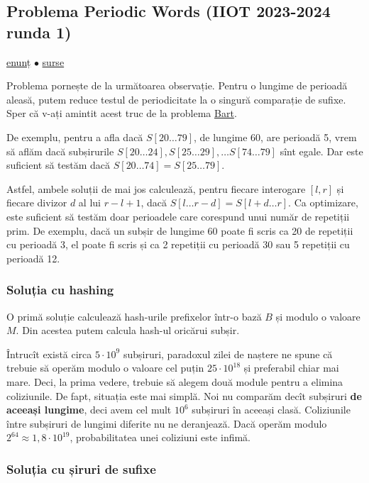 \documentclass[../main.tex]{subfiles}
\begin{document}
\subsection{Problema Periodic Words (IIOT 2023-2024 runda 1)}
\label{problem:periodic-words}

\href{https://kilonova.ro/problems/1940}{enunț}
$\bullet$
\hyperref[code:periodic-words]{surse}

Problema pornește de la următoarea observație. Pentru o lungime de perioadă aleasă, putem reduce testul de periodicitate la o singură comparație de sufixe. Sper că v-ați amintit acest truc de la problema \hyperref[problem:bart]{Bart}.

De exemplu, pentru a afla dacă $S[20 \dots 79]$, de lungime 60, are perioadă 5, vrem să aflăm dacă subșirurile $S[20 \dots 24], S[25 \dots 29], \dots S[74 \dots 79]$ sînt egale. Dar este suficient să testăm dacă $S[20 \dots 74] = S[25 \dots 79]$.

Astfel, ambele soluții de mai jos calculează, pentru fiecare interogare $[l, r]$ și fiecare divizor $d$ al lui $r - l + 1$, dacă $S[l \dots r - d] = S[l + d \dots r]$. Ca optimizare, este suficient să testăm doar perioadele care corespund unui număr de repetiții prim. De exemplu, dacă un subșir de lungime 60 poate fi scris ca 20 de repetiții cu perioadă 3, el poate fi scris și ca 2 repetiții cu perioadă 30 sau 5 repetiții cu perioadă 12.

\subsubsection*{Soluția cu hashing}

O primă soluție calculează hash-urile prefixelor într-o bază $B$ și modulo o valoare $M$. Din acestea putem calcula hash-ul oricărui subșir.

Întrucît există circa $5 \cdot 10^9$ subșiruri, paradoxul zilei de naștere ne spune că trebuie să operăm modulo o valoare cel puțin $25 \cdot 10^{18}$ și preferabil chiar mai mare. Deci, la prima vedere, trebuie să alegem două module pentru a elimina coliziunile. De fapt, situația este mai simplă. Noi nu comparăm decît subșiruri \textbf{de aceeași lungime}, deci avem cel mult $10^6$ subșiruri în aceeași clasă. Coliziunile între subșiruri de lungimi diferite nu ne deranjează. Dacă operăm modulo $2^{64} \approx 1,8 \cdot 10^{19}$, probabilitatea unei coliziuni este infimă.

\subsubsection*{Soluția cu șiruri de sufixe}
\end{document}
